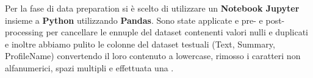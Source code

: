 Per la fase di data preparation si è scelto di utilizzare un \textbf{Notebook Jupyter} insieme a \textbf{Python} utilizzando \textbf{Pandas}.
Sono state applicate  e  pre- e post-processing per cancellare le ennuple del dataset contenenti valori nulli e duplicati e inoltre abbiamo pulito le colonne del dataset testuali (Text, Summary, ProfileName) convertendo il loro contenuto a lowercase, rimosso i caratteri non alfanumerici, spazi multipli e effettuata una .
